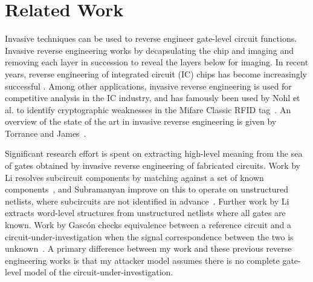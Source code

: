 \documentclass[proposal]{umassthesis}  %
\begin{document}








\chapter{Related Work}

Invasive techniques can be used to reverse engineer gate-level circuit functions. Invasive reverse engineering works by decapsulating the chip and imaging and removing each layer in succession to reveal the layers below for imaging. 
%
In recent years, reverse engineering of integrated circuit (IC) chips has become increasingly successful \cite{torrance-11}. 
%
Among other applications, invasive reverse engineering is used for competitive analysis in the IC industry, and has famously been used by Nohl et al. to identify cryptographic weaknesses in the Mifare Classic RFID tag~\cite{nohl-08}. An overview of the state of the art in invasive reverse engineering is given by Torrance and James~\cite{torrance-11}.


Significant research effort is spent on extracting high-level meaning from the sea of gates obtained by invasive reverse engineering of fabricated circuits. Work by Li resolves subcircuit components by matching against a set of known components~\cite{li-12}, and Subramanyan improve on this to operate on unstructured netlists, where subcircuits are not identified in advance~\cite{subramanyan-13}. Further work by Li  extracts word-level structures from unstructured netlists where all gates are known. Work by Gasc{\'o}n  checks equivalence between a reference circuit and a circuit-under-investigation when the signal correspondence between the two is unknown~\cite{gascon-14}. A primary difference between my work and these previous reverse engineering works is that my attacker model assumes there is no complete gate-level model of the circuit-under-investigation.
\end{document}
